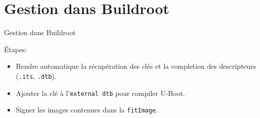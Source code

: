 \documentclass[aspectratio=169]{beamer}
\begin{document}
%
%
%
%


\section{Gestion dans Buildroot}

\begin{frame}
\begin{center}
\huge{Gestion dans Buildroot}
\end{center}
\end{frame}

\begin{frame}
Étapes:
\begin{itemize}
\item Rendre automatique la récupération des clés et la completion des descripteurs (\texttt{.its}, \texttt{.dtb}).
\item Ajouter la clé à l'\texttt{external dtb} pour compiler U-Boot.
\item Signer les images contenues dans la \texttt{fitImage}.
\end{itemize}
\end{frame}
\end{document}
